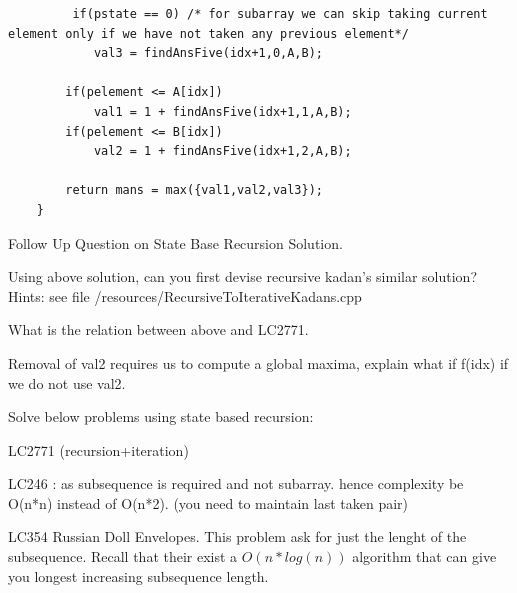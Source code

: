 \begin{solution}
\begin{minipage}{\textwidth}
\begin{lstlisting}
         if(pstate == 0) /* for subarray we can skip taking current element only if we have not taken any previous element*/
            val3 = findAnsFive(idx+1,0,A,B);
        
        if(pelement <= A[idx])
            val1 = 1 + findAnsFive(idx+1,1,A,B);
        if(pelement <= B[idx])
            val2 = 1 + findAnsFive(idx+1,2,A,B);
        
        return mans = max({val1,val2,val3});
    }
\end{lstlisting}
\end{minipage}
\end{solution}

\begin{solution}
    Follow Up Question on State Base Recursion Solution.
    \begin{asparaenum}[(a)]
        \item Using above solution, can you first devise recursive kadan's similar solution? 
        Hints: see file /resources/RecursiveToIterativeKadans.cpp
        \item What is the relation between above and LC2771.
        \item Removal of val2 requires us to compute a global maxima, explain what if f(idx) if we do not use val2.
        \item Solve below problems using state based recursion:
        \item LC2771 (recursion+iteration)
        \item LC246 : as subsequence is required and not subarray. hence complexity be O(n*n) instead of O(n*2). (you need to maintain last taken pair)
        \item LC354 Russian Doll Envelopes. This problem ask for just the lenght of the subsequence. Recall that their exist a $O(n*log(n))$ algorithm that can give you longest increasing subsequence length.
    \end{asparaenum}  
\end{solution}


